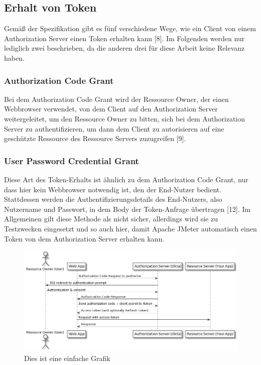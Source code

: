 \subsection{Erhalt von Token}
\label{subsec:background:second_section:second_subsection}

Gemäß der Spezifikation gibt es fünf verschiedene Wege, wie ein Client von einem Authorization Server einen Token erhalten kann [8]. Im Folgenden werden nur lediglich zwei beschrieben, da die anderen drei für diese Arbeit keine Relevanz haben. 

\subsubsection{Authorization Code Grant}
\label{ssubsec:background:second_section:first_subsection:first_subsubsection}
Bei dem Authorization Code Grant wird der Ressource Owner, der einen Webbrowser verwendet, von dem Client auf den Authorization Server weitergeleitet, um den Ressource Owner zu bitten, sich bei dem Authorization Server zu authentifizieren, um dann dem Client zu autorisieren auf eine geschützte Ressource des Ressource Servers zuzugreifen [9]. 

\subsubsection{User Password Credential Grant}
\label{ssubsec:background:second_section:first_subsection:second_subsubsection}
Diese Art des Token-Erhalts ist ähnlich zu dem Authorization Code Grant, nur dass hier kein Webbrowser notwendig ist, den der End-Nutzer bedient. Stattdessen werden die Authentifizierungsdetails des End-Nutzers, also Nutzername und Passwort, in dem Body der Token-Anfrage übertragen [12]. Im Allgemeinen gilt diese Methode als nicht sicher, allerdings wird sie zu Testzwecken eingesetzt und so auch hier, damit Apache JMeter automatisch einen Token von dem Authorization Server erhalten kann.

\begin{figure}[htbp]
  \centering
  \includegraphics[width=1.0\textwidth]{gfx/oauth_auth_code_flow.png}
  \caption{Dies ist eine einfache Grafik}
  \label{fig:chapter02:Bild1}
 \end{figure}